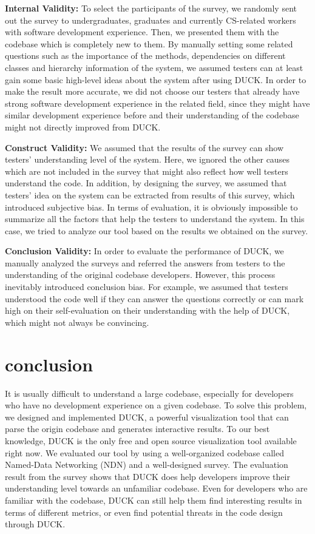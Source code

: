 \documentclass{sig-alternate}
\begin{document}
\textbf{Internal Validity:} To select the participants of the survey, we randomly sent out the survey to undergraduates, graduates and currently CS-related workers with software development experience. Then, we presented them with the codebase which is completely new to them. By manually setting some related questions such as the importance of the methods, dependencies on different classes and hierarchy information of the system, we assumed testers can at least gain some basic high-level ideas about the system after using DUCK. In order to make the result more accurate, we did not choose our testers that already have strong software development experience in the related field, since they might have similar development experience before and their understanding of the codebase might not directly improved from DUCK. 

\textbf{Construct Validity:} We assumed that the results of the survey can show testers' understanding level of the system. Here, we ignored the other causes which are not included in the survey that might also reflect how well testers understand the code. In addition, by designing the survey, we assumed that testers' idea on the system can be extracted from results of this survey, which introduced subjective bias. In terms of evaluation, it is obviously impossible to summarize all the factors that help the testers to understand the system. In this case, we tried to analyze our tool based on the results we obtained on the survey.

\textbf{Conclusion Validity:} In order to evaluate the performance of DUCK, we manually analyzed the surveys and referred the answers from testers to the understanding of the original codebase developers. However, this process inevitably introduced conclusion bias. For example, we assumed that testers understood the code well if they can answer the questions correctly or can mark high on their self-evaluation on their understanding with the help of DUCK, which might not always be convincing.       

\section{conclusion}
It is usually difficult to understand a large codebase, especially for developers who have no development experience on a given codebase. To solve this problem, we designed and implemented DUCK, a powerful visualization tool that can parse the origin codebase and generates interactive results. To our best knowledge, DUCK is the only free and open source visualization tool available right now. We evaluated our tool by using a well-organized codebase called Named-Data Networking (NDN) and a well-designed survey. The evaluation result from the survey shows that DUCK does help developers improve their understanding level towards an unfamiliar codebase. Even for developers who are familiar with the codebase, DUCK can still help them find interesting results in terms of different metrics, or even find potential threats in the code design through DUCK.
\end{document}
